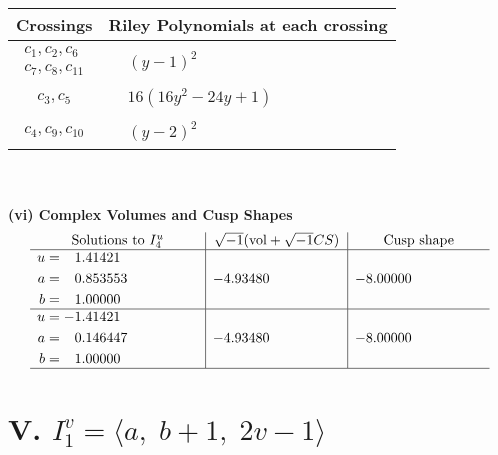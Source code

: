 \documentclass[1p]{elsarticle_modified}
\theoremstyle{definition}
\newcommand{\I}{\sqrt{-1}}
\begin{document}
\begin{tabular}{m{50pt}|m{274pt}}
Crossings & \hspace{64pt}Riley Polynomials at each crossing \\
\hline $$\begin{aligned}c_{1},c_{2},c_{6}\\c_{7},c_{8},c_{11}\end{aligned}$$&$\begin{aligned}
&(y-1)^2
\end{aligned}$\\
\hline $$\begin{aligned}c_{3},c_{5}\end{aligned}$$&$\begin{aligned}
&16(16 y^2-24 y+1)
\end{aligned}$\\
\hline $$\begin{aligned}c_{4},c_{9},c_{10}\end{aligned}$$&$\begin{aligned}
&(y-2)^2
\end{aligned}$\\
\hline
\end{tabular}\\~\\
\newpage\flushleft \textbf{(vi) Complex Volumes and Cusp Shapes}
$$\begin{array}{c|c|c}  
\text{Solutions to }I^u_{4}& \I (\text{vol} + \sqrt{-1}CS) & \text{Cusp shape}\\
 \hline 
\begin{aligned}
u &= \phantom{-}1.41421\phantom{ +0.000000I} \\
a &= \phantom{-}0.853553\phantom{ +0.000000I} \\
b &= \phantom{-}1.00000\phantom{ +0.000000I}\end{aligned}
 & -4.93480\phantom{ +0.000000I} & -8.00000\phantom{ +0.000000I} \\ \hline\begin{aligned}
u &= -1.41421\phantom{ +0.000000I} \\
a &= \phantom{-}0.146447\phantom{ +0.000000I} \\
b &= \phantom{-}1.00000\phantom{ +0.000000I}\end{aligned}
 & -4.93480\phantom{ +0.000000I} & -8.00000\phantom{ +0.000000I}\\
 \hline 
 \end{array}$$\newpage\newpage\renewcommand{\arraystretch}{1}
\centering \section*{V. $I^v_{1}= \langle a,\;b+1,\;2 v-1 \rangle$}
\end{document}
